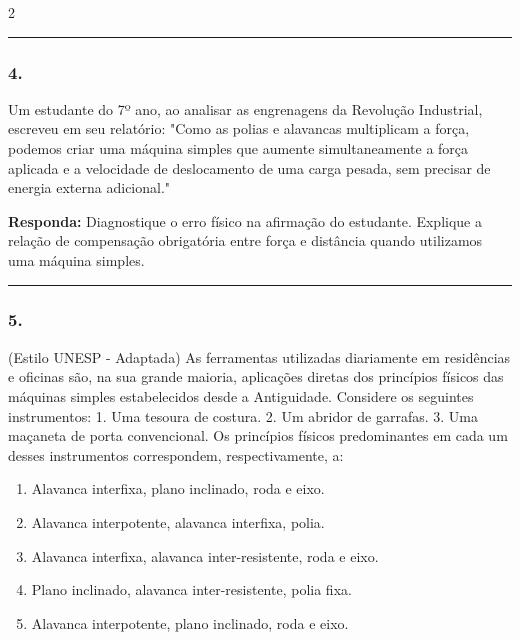 \documentclass[twoside, 10pt, a4paper]{article}
\newlength{\espacoPreQuestao}\setlength{\espacoPreQuestao}{0.1cm}
\newlength{\espacoQuestao}\setlength{\espacoQuestao}{0.2cm}
\newlength{\espacoAlt}\setlength{\espacoAlt}{0.2cm}
\begin{document}
\begin{multicols*}{2}
\noindent\textcolor{CorLinha}{\rule{\linewidth}{0.5pt}}
\par\vspace{\espacoPreQuestao}
\subsubsection*{4.} Um estudante do 7º ano, ao analisar as engrenagens da Revolução Industrial, escreveu em seu relatório: "Como as polias e alavancas multiplicam a força, podemos criar uma máquina simples que aumente simultaneamente a força aplicada e a velocidade de deslocamento de uma carga pesada, sem precisar de energia externa adicional."
\begin{boxresponda}
\textbf{Responda:} Diagnostique o erro físico na afirmação do estudante. Explique a relação de compensação obrigatória entre força e distância quando utilizamos uma máquina simples.
\end{boxresponda}
\par\vspace{\espacoQuestao}

\noindent\textcolor{CorLinha}{\rule{\linewidth}{0.5pt}} 
\par\vspace{\espacoPreQuestao}
\subsubsection*{5.} (Estilo UNESP - Adaptada) As ferramentas utilizadas diariamente em residências e oficinas são, na sua grande maioria, aplicações diretas dos princípios físicos das máquinas simples estabelecidos desde a Antiguidade. Considere os seguintes instrumentos:
1. Uma tesoura de costura.
2. Um abridor de garrafas.
3. Uma maçaneta de porta convencional.
Os princípios físicos predominantes em cada um desses instrumentos correspondem, respectivamente, a:
\begin{enumerate}[label=\alph*), itemsep=\espacoAlt]
    \item Alavanca interfixa, plano inclinado, roda e eixo.
    \item Alavanca interpotente, alavanca interfixa, polia.
    \item Alavanca interfixa, alavanca inter-resistente, roda e eixo.
    \item Plano inclinado, alavanca inter-resistente, polia fixa.
    \item Alavanca interpotente, plano inclinado, roda e eixo.
\end{enumerate}
\par\vspace{\espacoQuestao}


\end{multicols*}
\end{document}
